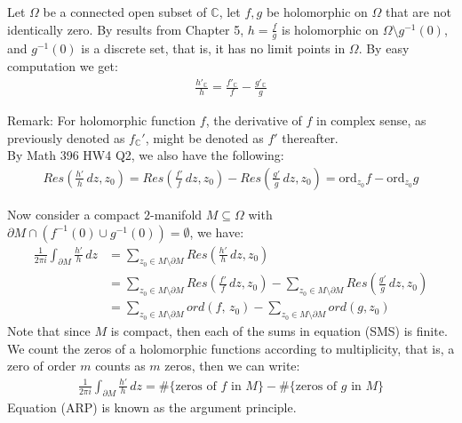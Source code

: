 \documentclass[15pt]{book}
\theoremstyle{break}
\theoremstyle{break}
\newcommand{\Complex}{\mathbb{C}}
\newcommand{\remark}{\color{blue}Remark: \color{black}}
\begin{document}
Let $\Omega$ be a connected open subset of $\Complex$, let $f,g$ be holomorphic on $\Omega$ that are not identically zero. By results from Chapter 5, $h = \frac{f}{g}$ is holomorphic on $\Omega \setminus g^{-1}(0)$, and $g^{-1}(0)$ is a discrete set, that is, it has no limit points in $\Omega$. By easy computation we get:
\begin{align*}
\frac{h'_{\Complex}}{h} = \frac{f'_{\Complex}}{f} -\frac{g'_{\Complex}}{g}
\end{align*}

\remark For holomorphic function $f$, the derivative of $f$ in complex sense, as previously denoted as $f_{\Complex}'$, might be denoted as $f'$ thereafter.\\

By Math 396 HW4 Q2, we also have the following:
\begin{align*}
Res\left(\frac{h'}{h}\, dz, z_0\right) = Res\left(\frac{f'}{f}\, dz, z_0\right) - Res\left(\frac{g'}{g}\, dz, z_0\right)= \text{ord}_{z_0}f - \text{ord}_{z_0}g
\end{align*}

Now consider a compact $2$-manifold $M\subseteq \Omega$ with $\partial M \cap (f^{-1}(0) \cup g^{-1}(0)) = \emptyset$, we have:
\begin{align*}
\frac{1}{2\pi i}\int_{\partial M}\frac{h'}{h}\, dz &= \sum_{z_0 \in M\setminus \partial M} Res\left(\frac{h'}{h}\, dz, z_0\right) \\
&= \sum_{z_0 \in M\setminus \partial M} Res\left(\frac{f'}{f}\, dz, z_0\right)  - \sum_{z_0 \in M\setminus \partial M} Res\left(\frac{g'}{g}\, dz, z_0\right) \\
&= \sum_{z_0 \in M\setminus \partial M} ord(f,\, z_0) - \sum_{z_0 \in M\setminus \partial M} ord(g,z_0) \tag{SMS}
\end{align*}
Note that since $M$ is compact, then each of the sums in equation (SMS) is finite. We count the zeros of a holomorphic functions according to multiplicity, that is, a zero of order $m$ counts as $m$ zeros, then we can write:
\begin{align*}
\frac{1}{2\pi i}\int_{\partial M}\frac{h'}{h}\, dz = \#\{\text{zeros of }f \text{ in }M\} - \#\{\text{zeros of }g \text{ in }M\} \tag{ARP}
\end{align*}
Equation (ARP) is known as the argument principle. \\
\end{document}
